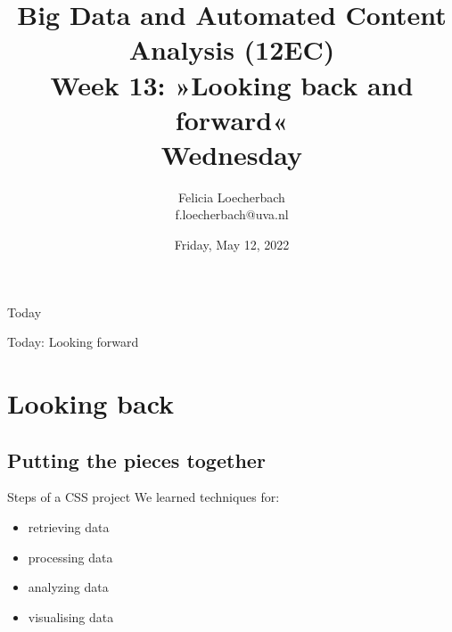

\graphicspath{{../../resources/img/}}




\title[Big Data and Automated Content Analysis]{\textbf{Big Data and Automated Content Analysis (12EC)} 
\\Week 13: »Looking back and forward«
\\Wednesday}
\author[Felicia Loecherbach]{Felicia Loecherbach\\ \footnotesize{f.loecherbach@uva.nl \\}}
\date{Friday, May 12, 2022}


\begin{frame}{}
	\titlepage
\end{frame}

\begin{frame}{Today}
	\tableofcontents
\end{frame}


\begin{frame}[standout]
Today: Looking forward
\end{frame}




\section{Looking back}
\subsection{Putting the pieces together}


\begin{frame}{Steps of a CSS project}
We learned techniques for:
\begin{itemize}
\item retrieving data
\item processing data
\item analyzing data
\item visualising data
\end{itemize}
	
\end{frame}

